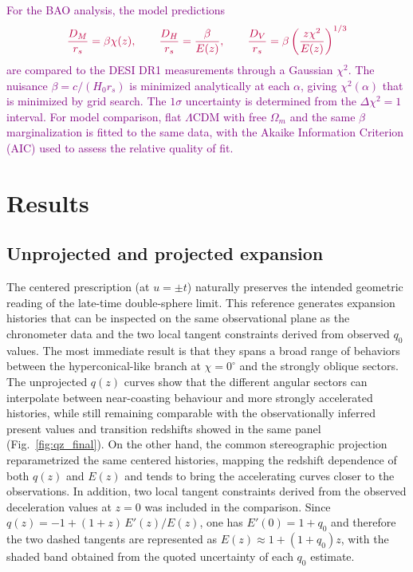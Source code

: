 \documentclass[11pt]{article}
\newcommand{\purple}[1]{\textcolor{purple}{#1}}
\begin{document}
\purple{For the BAO analysis, the model predictions}
\begin{equation}
\purple{
\frac{D_M}{r_s} = \beta \chi(z),
\qquad
\frac{D_H}{r_s} = \frac{\beta}{E(z)},
\qquad
\frac{D_V}{r_s} = \beta \left(\frac{z\chi^2}{E(z)}\right)^{1/3}
}
\end{equation}
\purple{are compared to the DESI DR1 measurements through a Gaussian $\chi^2$. The nuisance $\beta = c/(H_0 r_s)$ is minimized analytically at each $\alpha$, giving $\chi^2(\alpha)$ that is minimized by grid search. The $1\sigma$ uncertainty is determined from the $\Delta \chi^2 = 1$ interval. For model comparison, flat $\Lambda$CDM with free $\Omega_m$ and the same $\beta$ marginalization is fitted to the same data, with the Akaike Information Criterion (AIC) used to assess the relative quality of fit.}


\section{Results}

\subsection{Unprojected and projected expansion}

The centered prescription (at $u=\pm t$) naturally preserves the intended geometric reading of the late-time double-sphere limit. This reference generates expansion histories that can be inspected on the same observational plane as the chronometer data and the two local tangent constraints derived from observed $q_0$ values.  The most immediate result is that they spans a broad range of behaviors between the hyperconical-like branch at $\chi=0^\circ$ and the strongly oblique sectors. The unprojected $q(z)$ curves show that the different angular sectors can interpolate between near-coasting behaviour and more strongly accelerated histories, while still remaining comparable with the observationally inferred present values and transition redshifts showed in the same panel (Fig.~\ref{fig:qz_final}). On the other hand, the common stereographic projection reparametrized the same centered histories, mapping the redshift dependence of both $q(z)$ and $E(z)$ and tends to bring the accelerating curves closer to the observations. In addition, two local tangent constraints derived from the observed deceleration values at $z=0$ was included in the comparison. Since $q(z)=-1+(1+z)\,E'(z)/E(z)$, one has $E'(0)=1+q_0$ and therefore the two dashed tangents are represented as $E(z)\approx1+(1+q_0)z$, with the shaded band obtained from the quoted uncertainty of each $q_0$ estimate.
\end{document}
